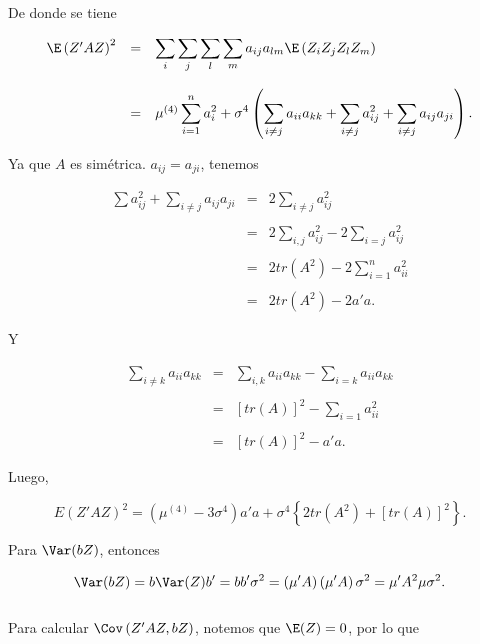 \begin{teo}
    De donde se tiene

    $$
    \begin{array}{rcl}
	\E\left(Z'AZ\right)^2 &=& \displaystyle\sum_i\sum_j\sum_l\sum_m a_{ij}a_{lm}\E\left(Z_iZ_jZ_lZ_m\right)\\\\
			      &=& \mu^{(4)}\displaystyle\sum_{i=1}^n a_{i}^2 +\sigma^4 \left(\sum_{i\neq j}a_{ii}a_{kk}+\sum_{i\neq j}a_{ij}^2+\sum_{i\neq j}a_{ij}a_{ji}\right).
    \end{array}
    $$

    Ya que $A$ es simétrica. $a_{ij}=a_{ji}$, tenemos

    $$
    \begin{array}{rcl}
	\displaystyle\sum a_{ij}^2 + \sum_{i\neq j} a_{ij}a_{ji} &=& 2\displaystyle\sum_{i\neq j}a_{ij}^2\\\\
								 &=& 2\displaystyle\sum_{i,j} a_{ij}^2 - 2\sum_{i=j}a_{ij}^2\\\\
								 &=& 2tr\left(A^2\right)-2\displaystyle\sum_{i=1}^n a_{ii}^2\\\\
								 &=& 2tr\left(A^2\right)-2a'a.
    \end{array}
    $$

    Y

    $$
    \begin{array}{rcl}
	\displaystyle\sum_{i\neq k} a_{ii}a_{kk} &=& \displaystyle\sum_{i,k}a_{ii}a_{kk} - \sum_{i=k}a_{ii}a_{kk}\\\\
						 &=& \left[tr(A)\right]^2 - \displaystyle\sum_{i=1} a_{ii}^2\\\\
						 &=& \left[tr(A)\right]^2 - a'a.
    \end{array}
    $$

    Luego,

    $$E\left(Z'AZ\right)^2 = \left(\mu^{(4)}-3\sigma^4\right)a'a+\sigma^4\left\{2tr\left(A^2\right)+\left[tr(A)\right]^2\right\}.$$

    Para $\Var(bZ)$, entonces

    $$\Var(bZ)=b\Var(Z)b' = bb'\sigma^2 = \left(\mu' A\right)\left(\mu'A\right)\sigma^2 = \mu'A^2\mu\sigma^2.$$\\
    Para calcular $\Cov\left(Z'AZ,bZ\right)$, notemos que $\E(Z)=0$, por lo que


\end{teo}
